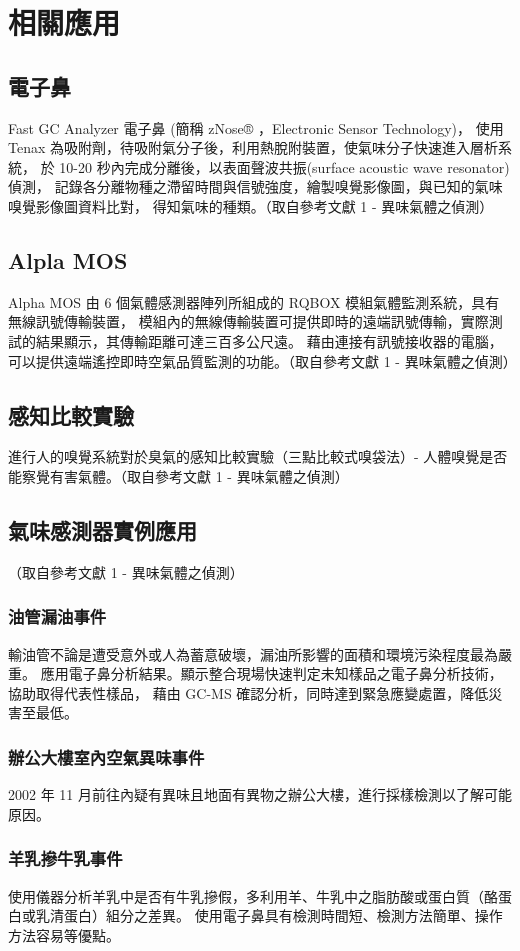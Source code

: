 \chapter{相關應用}

\section{電子鼻}
Fast GC Analyzer 電子鼻 (簡稱 zNose® ，Electronic Sensor Technology)，
使用 Tenax 為吸附劑，待吸附氣分子後，利用熱脫附裝置，使氣味分子快速進入層析系統，
於 10-20 秒內完成分離後，以表面聲波共振(surface acoustic wave resonator) 偵測，
記錄各分離物種之滯留時間與信號強度，繪製嗅覺影像圖，與已知的氣味嗅覺影像圖資料比對，
得知氣味的種類。（取自參考文獻 1 - 異味氣體之偵測）

\section{Alpla MOS}
Alpha MOS 由 6 個氣體感測器陣列所組成的 RQBOX 模組氣體監測系統，具有無線訊號傳輸裝置，
模組內的無線傳輸裝置可提供即時的遠端訊號傳輸，實際測試的結果顯示，其傳輸距離可達三百多公尺遠。
藉由連接有訊號接收器的電腦，可以提供遠端遙控即時空氣品質監測的功能。（取自參考文獻 1 - 異味氣體之偵測）

\section{感知比較實驗}
進行人的嗅覺系統對於臭氣的感知比較實驗（三點比較式嗅袋法）- 人體嗅覺是否能察覺有害氣體。（取自參考文獻 1 - 異味氣體之偵測）

\section{氣味感測器實例應用}
（取自參考文獻 1 - 異味氣體之偵測）\\
	\subsection{油管漏油事件}
	輸油管不論是遭受意外或人為蓄意破壞，漏油所影響的面積和環境污染程度最為嚴重。
	應用電子鼻分析結果。顯示整合現場快速判定未知樣品之電子鼻分析技術，協助取得代表性樣品，
	藉由 GC-MS 確認分析，同時達到緊急應變處置，降低災害至最低。
	\subsection{辦公大樓室內空氣異味事件}
	2002 年 11 月前往內疑有異味且地面有異物之辦公大樓，進行採樣檢測以了解可能原因。
	\subsection{羊乳摻牛乳事件}
	使用儀器分析羊乳中是否有牛乳摻假，多利用羊、牛乳中之脂肪酸或蛋白質（酪蛋白或乳清蛋白）組分之差異。
	使用電子鼻具有檢測時間短、檢測方法簡單、操作方法容易等優點。